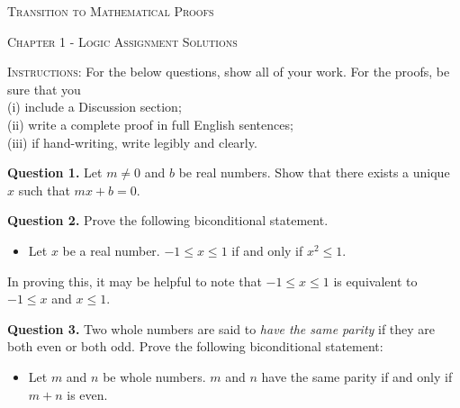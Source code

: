 \documentclass[10pt]{report}
\begin{document}
\begin{center}\textsc{\Large Transition to Mathematical Proofs}

\textsc{\large Chapter 1 - Logic Assignment Solutions}

\end{center}

\bigskip


\noindent\textsc{Instructions:}  For the below questions, show all of your work.  For the proofs, be sure that you \\

\noindent(i) include a Discussion section; \\
(ii) write a complete proof in full English sentences; \\
(iii) if hand-writing, write legibly and clearly.


\bigskip


\noindent\textbf{Question 1.}  Let $m \neq 0$ and $b$ be real numbers.  Show that there exists a unique $x$ such that $mx+b=0$.  



\bigskip\bigskip

\noindent\textbf{Question 2.}  Prove the following biconditional statement. 


\begin{itemize}

\item[] Let $x$ be a real number.   $-1 \leq x \leq 1$ if and only if $x^2 \leq 1$.  

\end{itemize}

\noindent In proving this, it may be helpful to note that $-1\leq x \leq 1$ is equivalent to $ -1\leq x$ and $x \leq 1$.  

\bigskip\bigskip


\noindent\textbf{Question 3.} Two whole numbers are said to \emph{have the same parity} if they are both even or both odd.  Prove the following biconditional statement:

\begin{itemize}

\item[]Let $m$ and $n$ be whole numbers.  $m$ and $n$ have the same parity if and only if $m+n$ is even.  

\end{itemize}

\medskip



\bigskip
\end{document}
